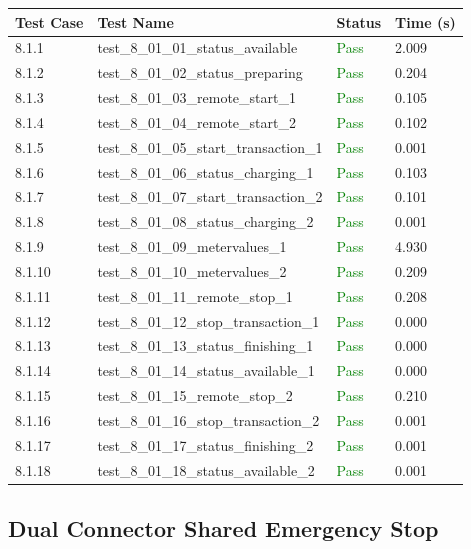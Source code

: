 \documentclass{article}
\begin{document}
\begin{longtable}{p{} p{} p{} p{}}
\toprule
\textbf{Test Case} & \textbf{Test Name} & \textbf{Status} & \textbf{Time (s)} \\
\midrule
\endhead
8.1.1 & test\_8\_01\_01\_status\_available & \textcolor{green}{Pass} & 2.009 \\
8.1.2 & test\_8\_01\_02\_status\_preparing & \textcolor{green}{Pass} & 0.204 \\
8.1.3 & test\_8\_01\_03\_remote\_start\_1 & \textcolor{green}{Pass} & 0.105 \\
8.1.4 & test\_8\_01\_04\_remote\_start\_2 & \textcolor{green}{Pass} & 0.102 \\
8.1.5 & test\_8\_01\_05\_start\_transaction\_1 & \textcolor{green}{Pass} & 0.001 \\
8.1.6 & test\_8\_01\_06\_status\_charging\_1 & \textcolor{green}{Pass} & 0.103 \\
8.1.7 & test\_8\_01\_07\_start\_transaction\_2 & \textcolor{green}{Pass} & 0.101 \\
8.1.8 & test\_8\_01\_08\_status\_charging\_2 & \textcolor{green}{Pass} & 0.001 \\
8.1.9 & test\_8\_01\_09\_metervalues\_1 & \textcolor{green}{Pass} & 4.930 \\
8.1.10 & test\_8\_01\_10\_metervalues\_2 & \textcolor{green}{Pass} & 0.209 \\
8.1.11 & test\_8\_01\_11\_remote\_stop\_1 & \textcolor{green}{Pass} & 0.208 \\
8.1.12 & test\_8\_01\_12\_stop\_transaction\_1 & \textcolor{green}{Pass} & 0.000 \\
8.1.13 & test\_8\_01\_13\_status\_finishing\_1 & \textcolor{green}{Pass} & 0.000 \\
8.1.14 & test\_8\_01\_14\_status\_available\_1 & \textcolor{green}{Pass} & 0.000 \\
8.1.15 & test\_8\_01\_15\_remote\_stop\_2 & \textcolor{green}{Pass} & 0.210 \\
8.1.16 & test\_8\_01\_16\_stop\_transaction\_2 & \textcolor{green}{Pass} & 0.001 \\
8.1.17 & test\_8\_01\_17\_status\_finishing\_2 & \textcolor{green}{Pass} & 0.001 \\
8.1.18 & test\_8\_01\_18\_status\_available\_2 & \textcolor{green}{Pass} & 0.001 \\
\bottomrule
\end{longtable}
\subsection{Dual Connector Shared Emergency Stop}
\end{document}
